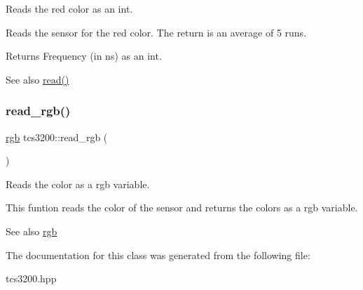 Reads the red color as an int. 

Reads the sensor for the red color. The return is an average of 5 runs. \begin{DoxyReturn}{Returns}
Frequency (in ns) as an int. 
\end{DoxyReturn}
\begin{DoxySeeAlso}{See also}
\hyperlink{classtcs3200_a02b9d9553e97b38bd3aab87bc5ea84b2}{read()} 
\end{DoxySeeAlso}
\mbox{\label{classtcs3200_ad2d5daf026a53178ea90f62f7f8b0adb}} 
\subsubsection{\texorpdfstring{read\+\_\+rgb()}{read\_rgb()}}
{\footnotesize\ttfamily \hyperlink{structrgb}{rgb} tcs3200\+::read\+\_\+rgb (\begin{DoxyParamCaption}{ }\end{DoxyParamCaption})\hspace{0.3cm}{\ttfamily [inline]}}



Reads the color as a rgb variable. 

This funtion reads the color of the sensor and returns the colors as a rgb variable. \begin{DoxySeeAlso}{See also}
\hyperlink{structrgb}{rgb} 
\end{DoxySeeAlso}


The documentation for this class was generated from the following file\+:\begin{DoxyCompactItemize}
\item 
tcs3200.\+hpp\end{DoxyCompactItemize}
